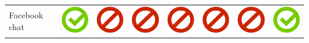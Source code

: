 \documentclass[10pt,foldmark,tumble]{leaflet}
\begin{document}
{\begin{tabular}{ L{2cm} | C{2cm} | C{2cm} | C{2cm} | C{2cm} | C{2cm} | C{2cm} | C{2cm} | }
Facebook chat & \includegraphics[scale=0.1]{pics/haken.png} & \includegraphics[scale=0.1]{pics/nohaken.png} & \includegraphics[scale=0.1]{pics/nohaken.png} & \includegraphics[scale=0.1]{pics/nohaken.png} & \includegraphics[scale=0.1]{pics/nohaken.png} & \includegraphics[scale=0.1]{pics/nohaken.png} & \includegraphics[scale=0.1]{pics/haken.png} \tabularnewline

\end{tabular}}
\end{document}
